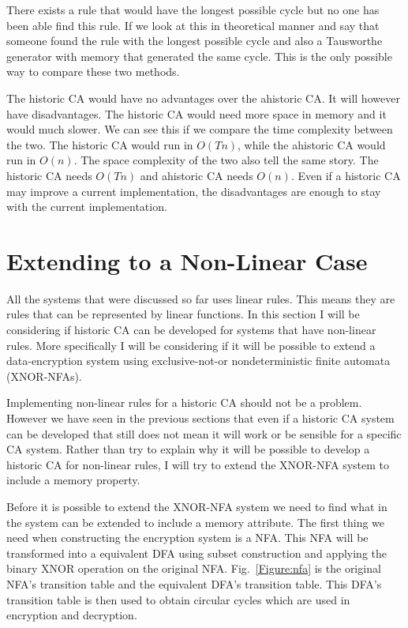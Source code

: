 \documentclass[a4paper,11pt,titlepage]{article}
\begin{document}
There exists a rule that would have the longest possible cycle but no one has been able find this rule. If we look at this in theoretical manner and say that someone found the rule with the longest possible cycle and also a Tausworthe generator with memory that generated the same cycle. This is the only possible way to compare these two methods.

The historic CA would have no advantages over the ahistoric CA. It will however have disadvantages. The historic CA would need more space in memory and it would much slower. We can see this if we compare the time complexity between the two. The historic CA would run in \emph{$O(Tn)$}, while the ahistoric CA would run in \emph{$O(n)$}. The space complexity of the two also tell the same story. The historic CA needs \emph{$O(Tn)$} and ahistoric CA needs \emph{$O(n)$}. Even if a historic CA may improve a current implementation, the disadvantages are enough to stay with the current implementation.

\section{Extending to a Non-Linear Case}
All the systems that were discussed so far uses linear rules. This means they are rules that can be represented by linear functions. In this section I will be considering if historic CA can be developed for systems that have non-linear rules. More specifically I will be considering if it will be possible to extend a data-encryption system using exclusive-not-or nondeterministic finite automata (XNOR-NFAs).

Implementing non-linear rules for a historic CA should not be a problem. However we have seen in the previous sections that even if a historic CA system can be developed that still does not mean it will work or be sensible for a specific CA system. Rather than try to explain why it will be possible to develop a historic CA for non-linear rules, I will try to extend the XNOR-NFA system to include a memory property.

Before it is possible to extend the XNOR-NFA system we need to find what in the system can be extended to include a memory attribute. The first thing we need when constructing the encryption system is a NFA. This NFA will be transformed into a equivalent DFA using subset construction and applying the binary XNOR operation on the original NFA. Fig.~\ref{Figure:nfa} is the original NFA's transition table and the equivalent DFA's transition table. This DFA's transition table is then used to obtain circular cycles which are used in encryption and decryption.
\end{document}
